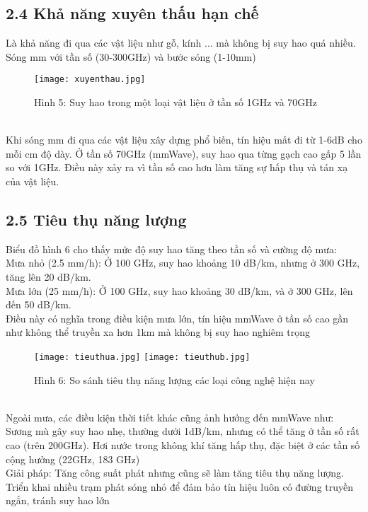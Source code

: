 \documentclass[a4paper,13pt]{article}
\begin{document}
\subsection{2.4 Khả năng xuyên thấu hạn chế}
Là khả năng đi qua các vật liệu như gỗ, kính ... mà không bị suy hao quá nhiều. Sóng mm với tần số (30-300GHz) và bước sóng (1-10mm) 
\begin{figure}[htbp]
    \centering
    \texttt{[image: xuyenthau.jpg]}
    \caption*{Hình 5: Suy hao trong một loại vật liệu ở tần số 1GHz và 70GHz \cite{key2} }
    \label{fig:model}
\end{figure}\\
Khi sóng mm đi qua các vật liệu xây dựng phổ biến, tín hiệu mất đi từ 1-6dB cho mỗi cm độ dày. Ở tần số 70GHz (mmWave), suy hao qua từng gạch cao gấp 5 lần so với 1GHz. Điều này xảy ra vì tần số cao hơn làm tăng sự hấp thụ và tán xạ của vật liệu. 

\subsection{2.5 Tiêu thụ năng lượng}
Biểu đồ hình 6 cho thấy mức độ suy hao tăng theo tần số và cường độ mưa: \\
Mưa nhỏ (2.5 mm/h): Ở 100 GHz, suy hao khoảng 10 dB/km, nhưng ở 300 GHz, tăng lên 20 dB/km. \\
Mưa lớn (25 mm/h): Ở 100 GHz, suy hao khoảng 30 dB/km, và ở 300 GHz, lên đến 50 dB/km. \\
Điều này có nghĩa trong điều kiện mưa lớn, tín hiệu mmWave ở tần số cao gần như không thể truyền xa hơn 1km mà không bị suy hao nghiêm trọng
\begin{figure}[htbp]
    \centering
    \texttt{[image: tieuthua.jpg]}
    \texttt{[image: tieuthub.jpg]}
    \caption*{Hình 6: So sánh tiêu thụ năng lượng các loại công nghệ hiện nay \cite{key3} }
    \label{fig:model}
\end{figure}\\
Ngoài mưa, các điều kiện thời tiết khác cũng ảnh hưởng đến mmWave như: \\
Sương mù gây suy hao nhẹ, thường dưới 1dB/km, nhưng có thể tăng ở tần số rất cao (trên 200GHz). Hơi nước trong không khí tăng hấp thụ, đặc biệt ở các tần số cộng hưởng (22GHz, 183 GHz)\\
Giải pháp: Tăng công suất phát nhưng cũng sẽ làm tăng tiêu thụ năng lượng. Triển khai nhiều trạm phát sóng nhỏ để đảm bảo tín hiệu luôn có đường truyền ngắn, tránh suy hao lớn
\clearpage
\end{document}
